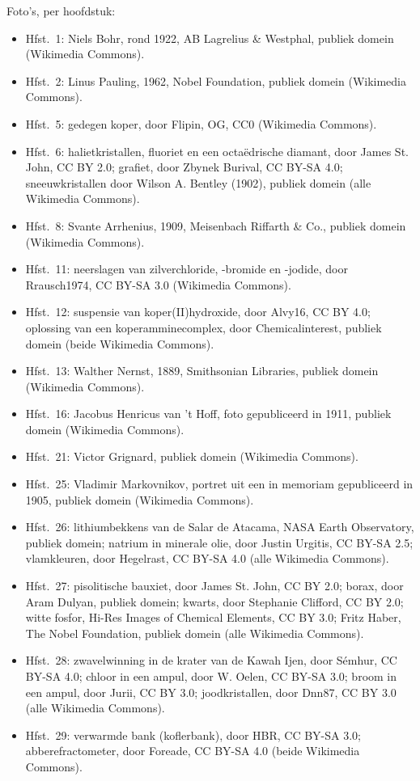 \bigskip
\noindent Foto's, per hoofdstuk:
\begin{itemize}\small
  \item Hfst.~1: Niels Bohr, rond 1922, AB Lagrelius \& Westphal, publiek
        domein (Wikimedia Commons).
  \item Hfst.~2: Linus Pauling, 1962, Nobel Foundation, publiek domein
        (Wikimedia Commons).
  \item Hfst.~5: gedegen koper, door Flipin, OG, CC0 (Wikimedia Commons).
  \item Hfst.~6: halietkristallen, fluoriet en een octaëdrische diamant,
        door James St. John, CC BY 2.0; grafiet, door Zbynek Burival,
        CC BY-SA 4.0; sneeuwkristallen door Wilson A. Bentley (1902),
        publiek domein (alle Wikimedia Commons).
  \item Hfst.~8: Svante Arrhenius, 1909, Meisenbach Riffarth \& Co.,
        publiek domein (Wikimedia Commons).
  \item Hfst.~11: neerslagen van zilverchloride, -bromide en -jodide, door
        Rrausch1974, CC BY-SA 3.0 (Wikimedia Commons).
  \item Hfst.~12: suspensie van koper(II)hydroxide, door Alvy16, CC BY 4.0;
        oplossing van een koperamminecomplex, door Chemicalinterest,
        publiek domein (beide Wikimedia Commons).
  \item Hfst.~13: Walther Nernst, 1889, Smithsonian Libraries, publiek
        domein (Wikimedia Commons).
  \item Hfst.~16: Jacobus Henricus van 't Hoff, foto gepubliceerd in 1911,
        publiek domein (Wikimedia Commons).
  \item Hfst.~21: Victor Grignard, publiek domein (Wikimedia Commons).
  \item Hfst.~25: Vladimir Markovnikov, portret uit een in memoriam
        gepubliceerd in 1905, publiek domein (Wikimedia Commons).
  \item Hfst.~26: lithiumbekkens van de Salar de Atacama, NASA Earth
        Observatory, publiek domein; natrium in minerale olie, door Justin
        Urgitis, CC BY-SA 2.5; vlamkleuren, door Hegelrast, CC BY-SA 4.0
        (alle Wikimedia Commons).
  \item Hfst.~27: pisolitische bauxiet, door James St. John, CC BY 2.0;
        borax, door Aram Dulyan, publiek domein; kwarts, door Stephanie
        Clifford, CC BY 2.0; witte fosfor, Hi-Res Images of Chemical
        Elements, CC BY 3.0; Fritz Haber, The Nobel Foundation, publiek
        domein (alle Wikimedia Commons).
  \item Hfst.~28: zwavelwinning in de krater van de Kawah Ijen, door
        S\'emhur, CC BY-SA 4.0; chloor in een ampul, door W. Oelen,
        CC BY-SA 3.0; broom in een ampul, door Jurii, CC BY 3.0;
        joodkristallen, door Dnn87, CC BY 3.0 (alle Wikimedia Commons).
  \item Hfst.~29: verwarmde bank (koflerbank), door HBR, CC BY-SA 3.0;
        abberefractometer, door Foreade, CC BY-SA 4.0 (beide Wikimedia
        Commons).
\end{itemize}
\clearpage
